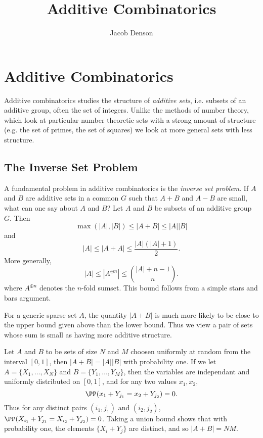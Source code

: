 

\title{Additive Combinatorics}
\author{Jacob Denson}




\maketitle

\tableofcontents


\chapter{Additive Combinatorics}

Additive combinatorics studies the structure of \emph{additive sets}, i.e. subsets of an additive group, often the set of integers. Unlike the methods of number theory, which look at particular number theoretic sets with a strong amount of structure (e.g. the set of primes, the set of squares) we look at more general sets with less structure. 

\section{The Inverse Set Problem}

A fundamental problem in additive combinatorics is the \emph{inverse set problem}. If $A$ and $B$ are additive sets in a common $G$ such that $A + B$ and $A - B$ are small, what can one say about $A$ and $B$? Let $A$ and $B$ be subsets of an additive group $G$. Then
%
\[ \max(|A|, |B|) \leq |A + B| \leq |A| |B| \]
%
and
%
\[ |A| \leq |A + A| \leq \frac{|A| (|A| + 1)}{2}. \]
%
More generally,
%
\[ |A| \leq |A^{\oplus n}| \leq {{|A| + n - 1}\choose{n}}. \]
%
where $A^{\oplus n}$ denotes the $n$-fold sumset. This bound follows from a simple stars and bars argument.

For a generic sparse set $A$, the quantity $|A + B|$ is much more likely to be close to the upper bound given above than the lower bound. Thus we view a pair of sets whose sum is small as having more additive structure.

\begin{example}
    Let $A$ and $B$ to be sets of size $N$ and $M$ choosen uniformly at random from the interval $[0,1]$, then $|A + B| = |A| |B|$ with probability one. If we let $A = \{ X_1,\dots, X_N \}$ and $B = \{ Y_1, \dots, Y_M \}$, then the variables are independant and uniformly distributed on $[0,1]$, and for any two values $x_1,x_2$,
    \[ \PP(x_1 + Y_{j_1} = x_2 + Y_{j_2}) = 0. \]
    Thus for any distinct pairs $(i_1,j_1)$ and $(i_2,j_2)$, $\PP(X_{i_1} + Y_{j_1} = X_{i_2} + Y_{j_2}) = 0$. Taking a union bound shows that with probability one, the elements $\{ X_i + Y_j \}$ are distinct, and so $|A + B| = NM$.
\end{example}

